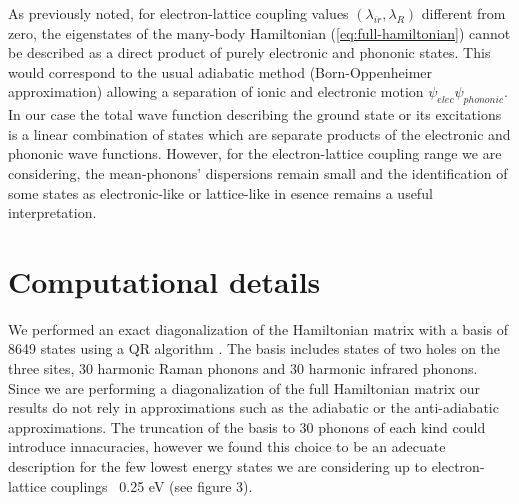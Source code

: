 As previously noted, for electron-lattice coupling values $(\lambda_{ir},\lambda_R)$ different from zero, the eigenstates of the many-body Hamiltonian (\ref{eq:full-hamiltonian}) cannot be described as a direct product of purely electronic and phononic states. 
This would correspond to the usual adiabatic method (Born-Oppenheimer approximation) allowing a separation of ionic and electronic motion $\psi_{elec}\psi_{phononic}$. 
In our case the total wave function describing the ground state or its excitations is a linear combination of states which are separate products of the electronic and phononic wave functions. 
However, for the electron-lattice coupling range we are considering, the mean-phonons' dispersions remain small and the identification of some states as electronic-like or lattice-like in esence remains a useful interpretation.


\section{Computational details}
\label{sec:comp_details}


We performed an exact diagonalization of the Hamiltonian matrix with a basis of 8649 states using a QR algorithm \cite{eigenweb}. 
The basis includes states of two holes on the three sites, 30 harmonic Raman phonons and 30 harmonic infrared phonons. 
Since we are performing a diagonalization of the full Hamiltonian matrix our results do not rely in approximations such as the adiabatic or the anti-adiabatic approximations. 
The  truncation of the basis to 30 phonons of each kind could introduce innacuracies, however we found this choice to be an adecuate description for the few lowest energy states we are considering up to electron-lattice couplings ~0.25 eV (see figure 3).
